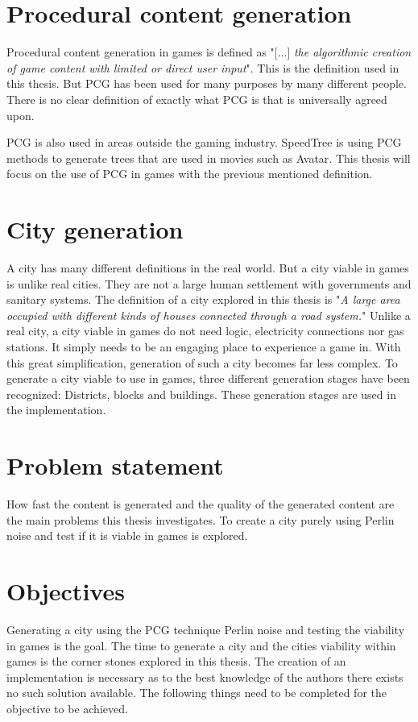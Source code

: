 	\section{Procedural content generation}
	Procedural content generation in games is defined as "[...] \textit{the algorithmic creation of game content with limited or direct user input}"\cite{WhatIsPCG}. This is the definition used in this thesis. But PCG has been used for many purposes by many different people. There is no clear definition of exactly what PCG is that is universally agreed upon\cite{WhatIsPCG}.
	
	PCG is also used in areas outside the gaming industry. SpeedTree\cite{SpeedTree} is using PCG methods to generate trees that are used in movies such as Avatar\cite{SpeedTreeMovies}.
	This thesis will focus on the use of PCG in games with the previous mentioned definition.
	
	\section{City generation}
	A city has many different definitions in the real world. But a city viable in games is unlike real cities. They are not a large human settlement with governments and sanitary systems. The definition of a city explored in this thesis is "\textit{A large area occupied with different kinds of houses connected through a road system.}"
	Unlike a real city, a city viable in games do not need logic, electricity connections nor gas stations. It simply needs to be an engaging place to experience a game in. With this great simplification, generation of such a city becomes far less complex.
	To generate a city viable to use in games, three different generation stages have been recognized: Districts, blocks and buildings. These generation stages are used in the implementation.
	
	\section{Problem statement}
	How fast the content is generated and the quality of the generated content are the main problems this thesis investigates.
	To create a city purely using Perlin noise and test if it is viable in games is explored.
	
	\section{Objectives}
	Generating a city using the PCG technique Perlin noise and testing the viability in games is the goal. The time to generate a city and the cities viability within games is the corner stones explored in this thesis. The creation of an implementation is necessary as to the best knowledge of the authors there exists no such solution available.
	The following things need to be completed for the objective to be achieved.
	
